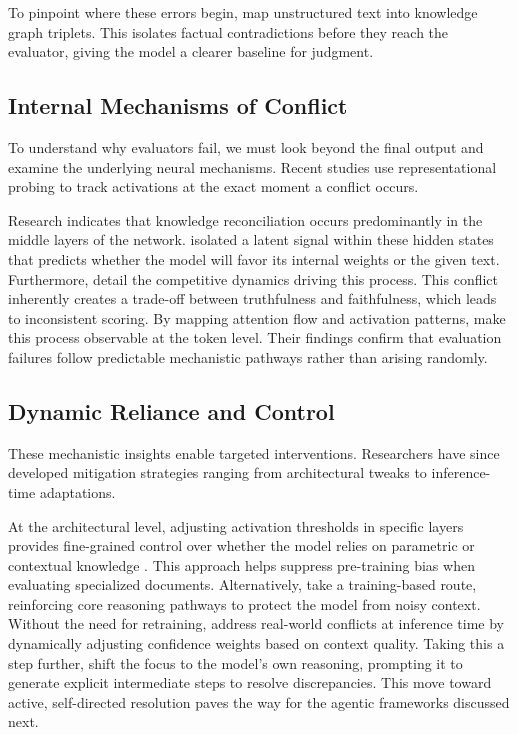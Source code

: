 To pinpoint where these errors begin, \citet{liu2025truthfulragresolvingfactuallevelconflicts} map unstructured text into knowledge graph triplets. This isolates factual contradictions before they reach the evaluator, giving the model a clearer baseline for judgment.

\subsection{Internal Mechanisms of Conflict}

To understand why evaluators fail, we must look beyond the final output and examine the underlying neural mechanisms. Recent studies use representational probing to track activations at the exact moment a conflict occurs.

Research indicates that knowledge reconciliation occurs predominantly in the middle layers of the network. \citet{gao2025probinglatentknowledgeconflict} isolated a latent signal within these hidden states that predicts whether the model will favor its internal weights or the given text. Furthermore, \citet{zhao2025understanding} detail the competitive dynamics driving this process. This conflict inherently creates a trade-off between truthfulness and faithfulness, which leads to inconsistent scoring. By mapping attention flow and activation patterns, \citet{ye2026seeingconflicttransparentknowledge} make this process observable at the token level. Their findings confirm that evaluation failures follow predictable mechanistic pathways rather than arising randomly.

\subsection{Dynamic Reliance and Control}

These mechanistic insights enable targeted interventions. Researchers have since developed mitigation strategies ranging from architectural tweaks to inference-time adaptations.

At the architectural level, adjusting activation thresholds in specific layers provides fine-grained control over whether the model relies on parametric or contextual knowledge \citep{bi2025parametersvscontextfinegrained}. This approach helps suppress pre-training bias when evaluating specialized documents. Alternatively, \citet{lin2026resistingcontextualinterferencerag} take a training-based route, reinforcing core reasoning pathways to protect the model from noisy context.
Without the need for retraining, \citet{wang2025accommodateknowledgeconflictsretrievalaugmented} address real-world conflicts at inference time by dynamically adjusting confidence weights based on context quality. Taking this a step further, \citet{huo2025microactmitigatingknowledgeconflict} shift the focus to the model's own reasoning, prompting it to generate explicit intermediate steps to resolve discrepancies. This move toward active, self-directed resolution paves the way for the agentic frameworks discussed next.